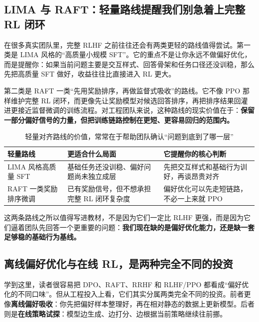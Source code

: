 \subsection{LIMA 与 RAFT：轻量路线提醒我们别急着上完整 RL 闭环}
在很多真实团队里，完整 RLHF 之前往往还会有两类更轻的路线值得尝试。第一类是 LIMA 风格的“高质量小规模 SFT”。它的重点不是让你永远不做偏好优化，而是提醒你：如果当前问题主要是交互样式、回答骨架和任务口径还没训稳，那么先把高质量 SFT 做好，收益往往比直接进入 RL 更大。

第二类是 RAFT 一类“先用奖励排序，再做监督式吸收”的路线。它不像 PPO 那样维护完整 RL 闭环，而更像先让奖励模型对候选回答排序，再把排序结果回灌进更接近监督微调的训练流程。对工程团队来说，这种路线的现实价值在于：\textbf{保留一部分偏好信号的力量，但把训练链路控制在更短、更容易回归的范围内。}

\begin{table}[H]
\centering
\small
\begin{tabularx}{\textwidth}{>{\raggedright\arraybackslash}p{2.6cm}>{\raggedright\arraybackslash}p{3cm}>{\raggedright\arraybackslash}X}
\toprule
\textbf{轻量路线} & \textbf{更适合什么局面} & \textbf{它提醒你的核心判断} \\
\midrule
LIMA 风格高质量 SFT & 基础任务还没训稳、偏好问题尚未独立成层 & 先把交互样式和基础行为训好，再谈昂贵对齐 \\
RAFT 一类奖励排序微调 & 已有奖励信号，但不想承担完整 RL 闭环复杂度 & 偏好优化可以先走短链路，不必一上来就 PPO \\
\bottomrule
\end{tabularx}
\caption{轻量对齐路线的价值，常常在于帮助团队确认“问题到底到了哪一层”}
\label{tab:light-alignment-routes}
\end{table}

这两条路线之所以值得写进教材，不是因为它们一定比 RLHF 更强，而是因为它们逼着团队先回答一个更重要的问题：\textbf{我们现在缺的是偏好优化能力，还是缺一套足够稳的基础行为基线。}

\subsection{离线偏好优化与在线 RL，是两种完全不同的投资}
学到这里，读者很容易把 DPO、RAFT、RRHF 和 RLHF/PPO 都看成“偏好优化的不同口味”。但从工程投入上看，它们其实分属两类完全不同的投资。前者更像\textbf{离线偏好吸收}：你先把偏好样本整理好，再在相对静态的数据上更新模型。后者则是\textbf{在线策略试探}：模型边生成、边打分、边根据当前策略继续往前挪。

